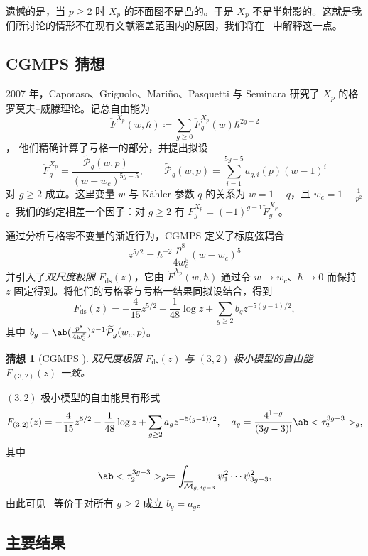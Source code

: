 \documentclass{amsart}
\newtheorem{conj}[thm]{猜想}
\theoremstyle{definition}
\theoremstyle{remark}
\theoremstyle{plain}
\theoremstyle{definition}
\theoremstyle{remark}
\newcommand{\Mbar}{\overline{\mathcal{M}}}
\newcommand{\mc}[1]{\mathcal{#1}}
\newcommand{\mr}[1]{\mathrm{#1}}
\newcommand{\wt}[1]{\widetilde{#1}}
\newcommand{\1}{\mathbf{1}}
\newcommand{\2}{\mathbf{2}}
\newcommand{\3}{\mathbf{3}}
\begin{document}
遗憾的是，当 \(p \geq 2\) 时 \(X_p\) 的环面图不是凸的。于是 \(X_p\) 不是半射影的。这就是我们所讨论的情形不在现有文献涵盖范围内的原因，我们将在~ 中解释这一点。

\subsection{CGMPS 猜想}%
\label{sub:The conjecture of CGMPS}

2007 年，Caporaso、Griguolo、Mari\~{n}o、Pasquetti 与 Seminara 研究了 \(X_p\) 的格罗莫夫–威滕理论。记总自由能为
\[ \check{F}^{X_p}(w,\hbar) \coloneqq \sum_{g \geq 0} \check{F}_g^{X_p}(w) \hbar^{2g-2} \]，
他们精确计算了亏格一的部分，并提出拟设
\begin{equation}\label{eqn:cgmps ansatz}
    \check{F}_g^{X_p} = \frac{\wt{\mc{P}}_g(w,p)}{(w-w_c)^{5g-5}}, \qquad \wt{\mc{P}}_g(w,p) = \sum_{i=1}^{5g-5} a_{g,i}(p)(w-1)^i
\end{equation}
对 \(g \geq 2\) 成立。这里变量 \(w\) 与 Kähler 参数 \(q\) 的关系为 \(w = 1-q\)，且 \(w_c = 1 - \frac{1}{p^2}\)。我们的约定相差一个因子：对 \(g \geq 2\) 有 \(F_g^{X_p} = (-1)^{g-1}\check{F}_g^{X_p}\)。

通过分析亏格零不变量的渐近行为，CGMPS 定义了标度弦耦合
\[ z^{5/2} = \hbar^{-2} \frac{p^8}{4w_c^5}(w-w_c)^5 \]
并引入了\textit{双尺度极限} \(F_{\mr{ds}}(z)\)，它由 \(\check{F}^{X_p}(w,\hbar)\) 通过令 \(w \to w_c\)、\(\hbar \to 0\) 而保持 \(z\) 固定得到。将他们的亏格零与亏格一结果同拟设结合，得到
\[ F_{\mr{ds}}(z) = -\frac{4}{15}z^{5/2} - \frac{1}{48}\log z + \sum_{g \geq 2} b_g z^{-5(g-1)/2}, \]
其中 \(b_g = \ab(\frac{p^8}{4w_c^5})^{g-1}\wt{\mc{P}}_g(w_c,p)\)。

\begin{conj}[CGMPS {\cite{CGMPS2007}}]%
\label{conj:cgmps}
    双尺度极限 \(F_{\mr{ds}}(z)\) 与 \((3,2)\) 极小模型的自由能 \(F_{(3,2)}(z)\) 一致。
\end{conj}

\((3,2)\) 极小模型的自由能具有形式
\[ F_{(3,2)}(z) = -\frac{4}{15}z^{5/2} - \frac{1}{48}\log z + \sum_{g\geq2} a_g z^{-5(g-1)/2}, \quad a_g = \frac{4^{1-g}}{(3g-3)!}\ab<\tau_2^{3g-3}>_g, \]
其中
\[ \ab<\tau_2^{3g-3}>_g \coloneqq \int_{\Mbar_{g,3g-3}} \psi_1^2 \cdots \psi_{3g-3}^2, \]
由此可见~ 等价于对所有 \(g \geq 2\) 成立 \(b_g = a_g\)。

\subsection{主要结果}%
\label{sub:The main results (Guo local P1)}
\end{document}
